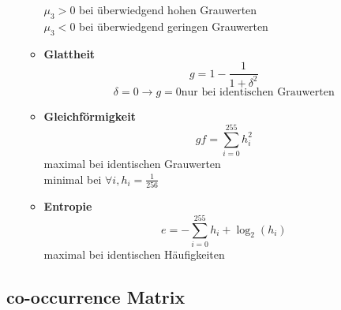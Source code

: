 \documentclass[a4paper,12pt]{scrreprt}
\newcommand{\itemd}[1]{\item{\textbf{#1}} }
\begin{document}
\begin{itemize}
\begin{itemize}
  $\mu_3 > 0$ bei überwiedgend hohen Grauwerten\\
  $\mu_3 < 0$ bei überwiedgend geringen Grauwerten\\
  \itemd{Glattheit}
  $$ g = 1 - \frac{1}{1 + \delta^2} $$
  $$ \delta = 0 \to g = 0 \text{nur bei identischen Grauwerten} $$ 
  \itemd{Gleichförmigkeit}
  $$ gf = \sum_{i=0}^{255} h_i^2$$
  maximal bei identischen Grauwerten\\
  minimal bei $\forall i, h_i = \frac{1}{256}$\\
  \itemd{Entropie}
  $$ e = - \sum_{i=0}^{255} h_i + \log_2(h_i)$$
  maximal bei identischen Häufigkeiten
 \end{itemize}
\end{itemize}

\subsection{co-occurrence Matrix}
\end{document}
